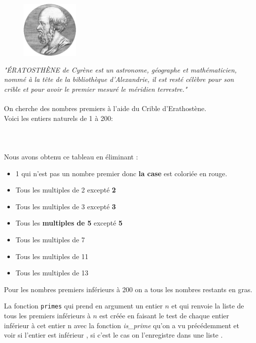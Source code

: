 \documentclass{article}
\begin{document}
\begin{figure}
\centering
\includegraphics[width=0.25\textwidth]{01.png}
\end{figure}
$$ $$
\textit{"ÉRATOSTHÈNE de Cyrène est un astronome, géographe et mathématicien, nommé à la tête de la bibliothèque d'Alexandrie, il est resté célèbre pour son crible et pour avoir le premier mesuré le méridien terrestre."}
\\
\\
$$ $$
	On cherche des nombres premiers à l'aide du Crible d'Erathostène.\\
Voici les entiers naturels de 1 à 200:
\\
\\

\\
\\

Nous avons obtenu ce tableau en éliminant :
\begin{itemize}[label=\textbullet, font=\LARGE \color{black}]
\item 1 qui n'est pas un nombre premier donc {\color{red}\textbf{la case}} est coloriée en rouge.
\item Tous les {\color{red}multiples de 2} excepté \textbf{2}
\item Tous les {\color{cyan}multiples de 3} excepté \textbf{3}
\item Tous les {\textbf{\color{yellow}multiples de 5}} excepté \textbf{5}
\item Tous les {\color{green}multiples de 7} 
\item Tous les {\color[RGB]{255,0,186}multiples de 11}
\item Tous les {\color[RGB]{150,0,186}multiples de 13}
\end{itemize}
$$ $$
Pour les nombres premiers inférieurs à 200 on a tous les nombres restants en gras.

La fonction \texttt{primes} qui prend en argument un entier $n$ et qui renvoie la liste de tous les premiers inférieurs à $n$ est créée en faisant le test de chaque entier inférieur à cet entier n avec la fonction \textit{is\_prime} qu'on a vu précédemment et voir si l'entier est inférieur , si c'est le cas on l'enregistre dans une liste . 
\end{document}
